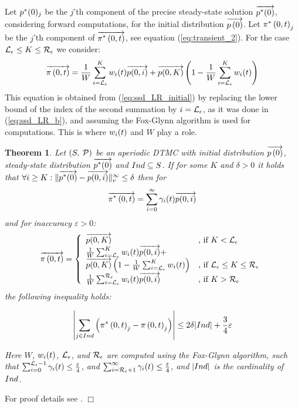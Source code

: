 \documentclass[times, 10pt,twocolumn]{article}
\newtheorem{theorem}{Theorem}
\newenvironment{proof}{\trivlist \item[\hskip \labelsep{\bf Proof}]}{\hfill\hbox{$\Box$}\endtrivlist}
\begin{document}

		Let $p^{*}(0)_{j}$ be the $j$'th component of the precise steady-state solution $\overrightarrow{p^{*}(0)}$, considering forward computations, for the initial distribution $\overrightarrow{p \left( 0 \right)}$.  
		Let $\pi^{*} \left(0, t \right )_{j}$ be the $j$'th component of $\overrightarrow{\pi^{*} \left(0, t \right )}$, see equation (\ref{eq:transient_2}). For the case $\mathcal{L}_{\epsilon} \leq K \leq \mathcal{R}_{\epsilon}$ we consider:
		{\small
		\[
			\overrightarrow{\pi \left(0, t \right )} = \frac{1}{W} \sum_{i=\mathcal{L}_{\epsilon}}^{K}w_{i}(t) \overrightarrow{p(0,i)} + \overrightarrow{p(0,K)} \left(1- \frac{1}{W} \sum_{i=\mathcal{L}_{\epsilon}}^{K}w_{i}(t) \right)
		\]
		}
		This equation is obtained from (\ref{eq:ssd_LR_initial}) by replacing the lower bound of the index of the second summation by $i=\mathcal{L}_{\epsilon}$, as it was done in (\ref{eq:ssd_LR_b}), and assuming the Fox-Glynn algorithm is used for computations. This is where $w_{i}(t)$ and $W$ play a role.
			
		\begin{theorem}
			Let $\left( S,\: \mathcal{P} \right)$ be an aperiodic DTMC with initial distribution $\overrightarrow{p \left( 0 \right)}$, steady-state distribution $\overrightarrow{p^{*}(0)}$ and $Ind \subseteq S$. If for some $K$ and $\delta > 0$ it holds that $\forall i \geq K : \lVert  \overrightarrow{p^{*}(0)} - \overrightarrow{p(0,i)}  \rVert_{v}^{\infty} \leq \delta$ then for 
			{\small
			\[
				\overrightarrow{\pi^{*} \left(0, t \right )} = \sum_{i=0}^{\infty}\gamma_{i}(t) \overrightarrow{p(0,i)}
			\]
			}
			and for inaccuracy $\varepsilon > 0$:
			{\small
			\begin{equation}
				\displaystyle
				\overrightarrow{\pi \left(0, t \right )} = \left\{
				\begin{array}{ll}
					\overrightarrow{p(0,K)} & \text{, if } K < \mathcal{L}_{\epsilon}\\
					\frac{1}{W} \sum_{i=\mathcal{L}_{\epsilon}}^{K}w_{i}(t) \overrightarrow{p(0,i)} + & \\
					\overrightarrow{p(0,K)} \left(1- \frac{1}{W} \sum_{i=\mathcal{L}_{\epsilon}}^{K}w_{i}(t) \right) & \text{, if } \mathcal{L}_{\epsilon} \leq K \leq \mathcal{R}_{\epsilon}\\
					\frac{1}{W} \sum_{i=\mathcal{L}_{\epsilon}}^{\mathcal{R}_{\epsilon}}w_{i}(t) \overrightarrow{p(0,i)} & \text{, if } K > \mathcal{R}_{\epsilon}\\
				\end{array}
				\right .
				\nonumber
			\end{equation}
			}
			the following inequality holds:
			{\small
			\begin{fframe}{0.85}{-0.3}
				\[
					\left| \sum_{j \in Ind} \left( \pi^{*} \left(0, t \right )_{j} - \pi \left(0, t \right )_{j} \right) \right| \leq 2 \delta |Ind| + \frac{3}{4} \varepsilon
				\]
			\end{fframe}
			}
			Here $W$, $w_{i}(t)$, $\mathcal{L}_{\epsilon}$, and $\mathcal{R}_{\epsilon}$ are computed using the Fox-Glynn algorithm, such that $\sum_{i=0}^{\mathcal{L}_{\epsilon}-1} \gamma_{i}(t) \leq \frac{\varepsilon}{4}$, and $\sum_{i=\mathcal{R}_{\epsilon}+1}^{\infty} \gamma_{i}(t) \leq \frac{\varepsilon}{4}$, and $| Ind |$ is the cardinality of $Ind$.
			\label{th:error_fwd}
		\end{theorem}
		\begin{proof}
			For proof details see \cite{KatoenZ_TR05}.
		\end{proof}
\end{document}
